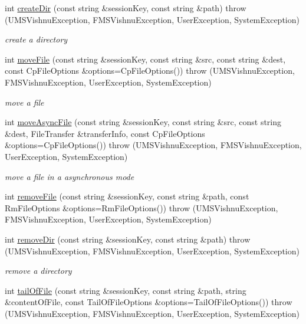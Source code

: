 \begin{DoxyCompactItemize}
int \hyperlink{namespacevishnu_ac5cba7c19df7cf1661a792e9d7c49c82}{createDir} (const string \&sessionKey, const string \&path)  throw (UMSVishnuException, FMSVishnuException, UserException, SystemException)
\begin{DoxyCompactList}\small\item\em create a directory \item\end{DoxyCompactList}\item 
int \hyperlink{namespacevishnu_aab0a15fe913c3cfb7f1ba8416b21f116}{moveFile} (const string \&sessionKey, const string \&src, const string \&dest, const CpFileOptions \&options=CpFileOptions())  throw (UMSVishnuException, FMSVishnuException, UserException, SystemException)
\begin{DoxyCompactList}\small\item\em move a file \item\end{DoxyCompactList}\item 
int \hyperlink{namespacevishnu_a1611f0d2a0056ab1c373211a5911b669}{moveAsyncFile} (const string \&sessionKey, const string \&src, const string \&dest, FileTransfer \&transferInfo, const CpFileOptions \&options=CpFileOptions())  throw (UMSVishnuException, FMSVishnuException, UserException, SystemException)
\begin{DoxyCompactList}\small\item\em move a file in a asynchronous mode \item\end{DoxyCompactList}\item 
int \hyperlink{namespacevishnu_aa524b5e536bf51e3ac68ec06ee429691}{removeFile} (const string \&sessionKey, const string \&path, const RmFileOptions \&options=RmFileOptions())  throw (UMSVishnuException, FMSVishnuException, UserException, SystemException)
\item 
int \hyperlink{namespacevishnu_a23105333be3ff847f7c274f6372364bc}{removeDir} (const string \&sessionKey, const string \&path)  throw (UMSVishnuException, FMSVishnuException, UserException, SystemException)
\begin{DoxyCompactList}\small\item\em remove a directory \item\end{DoxyCompactList}\item 
int \hyperlink{namespacevishnu_aa8c92237272b5c0e92360f617a2a4edc}{tailOfFile} (const string \&sessionKey, const string \&path, string \&contentOfFile, const TailOfFileOptions \&options=TailOfFileOptions())  throw (UMSVishnuException, FMSVishnuException, UserException, SystemException)

\end{DoxyCompactItemize}
